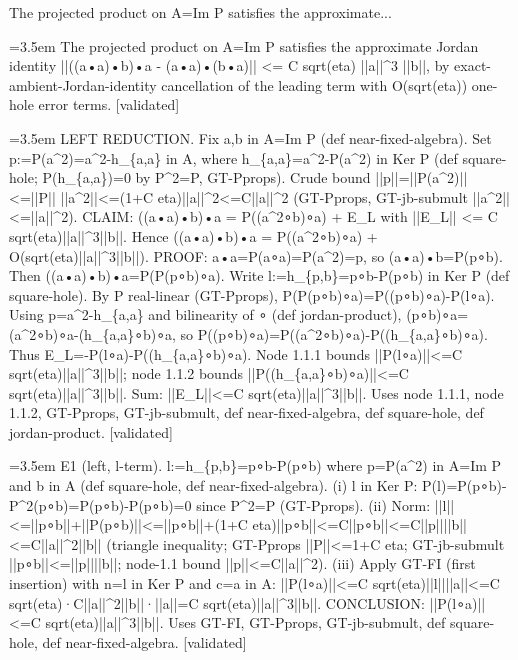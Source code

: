 \documentclass{article}
\newcommand{\step}[1]{\par\noindent\hangindent=3.5em\hangafter=1%
  \makebox[3.5em][l]{\textbf{#1.}}}
\newcommand{\steptag}[1]{\hfill{\small\textsf{[#1]}}}
\begin{document}
\begin{proofbox}{The projected product on A=Im P satisfies the approximate...}
\step{1} The projected product on A=Im P satisfies the approximate Jordan identity ||((a•a)•b)•a - (a•a)•(b•a)|| <= C sqrt(eta) ||a||\textasciicircum{}3 ||b||, by exact-ambient-Jordan-identity cancellation of the leading term with O(sqrt(eta)) one-hole error terms. \steptag{validated} \\[6pt]
\step{1.1} LEFT REDUCTION. Fix a,b in A=Im P (def near-fixed-algebra). Set p:=P(a\textasciicircum{}2)=a\textasciicircum{}2-h\_\{a,a\} in A, where h\_\{a,a\}=a\textasciicircum{}2-P(a\textasciicircum{}2) in Ker P (def square-hole; P(h\_\{a,a\})=0 by P\textasciicircum{}2=P, GT-Pprops). Crude bound ||p||=||P(a\textasciicircum{}2)||<=||P|| ||a\textasciicircum{}2||<=(1+C eta)||a||\textasciicircum{}2<=C||a||\textasciicircum{}2 (GT-Pprops, GT-jb-submult ||a\textasciicircum{}2||<=||a||\textasciicircum{}2). CLAIM: ((a•a)•b)•a = P((a\textasciicircum{}2∘b)∘a) + E\_L with ||E\_L|| <= C sqrt(eta)||a||\textasciicircum{}3||b||. Hence ((a•a)•b)•a = P((a\textasciicircum{}2∘b)∘a) + O(sqrt(eta)||a||\textasciicircum{}3||b||). PROOF: a•a=P(a∘a)=P(a\textasciicircum{}2)=p, so (a•a)•b=P(p∘b). Then ((a•a)•b)•a=P(P(p∘b)∘a). Write l:=h\_\{p,b\}=p∘b-P(p∘b) in Ker P (def square-hole). By P real-linear (GT-Pprops), P(P(p∘b)∘a)=P((p∘b)∘a)-P(l∘a). Using p=a\textasciicircum{}2-h\_\{a,a\} and bilinearity of ∘ (def jordan-product), (p∘b)∘a=(a\textasciicircum{}2∘b)∘a-(h\_\{a,a\}∘b)∘a, so P((p∘b)∘a)=P((a\textasciicircum{}2∘b)∘a)-P((h\_\{a,a\}∘b)∘a). Thus E\_L=-P(l∘a)-P((h\_\{a,a\}∘b)∘a). Node 1.1.1 bounds ||P(l∘a)||<=C sqrt(eta)||a||\textasciicircum{}3||b||; node 1.1.2 bounds ||P((h\_\{a,a\}∘b)∘a)||<=C sqrt(eta)||a||\textasciicircum{}3||b||. Sum: ||E\_L||<=C sqrt(eta)||a||\textasciicircum{}3||b||. Uses node 1.1.1, node 1.1.2, GT-Pprops, GT-jb-submult, def near-fixed-algebra, def square-hole, def jordan-product. \steptag{validated} \\[6pt]
\step{1.1.1} E1 (left, l-term). l:=h\_\{p,b\}=p∘b-P(p∘b) where p=P(a\textasciicircum{}2) in A=Im P and b in A (def square-hole, def near-fixed-algebra). (i) l in Ker P: P(l)=P(p∘b)-P\textasciicircum{}2(p∘b)=P(p∘b)-P(p∘b)=0 since P\textasciicircum{}2=P (GT-Pprops). (ii) Norm: ||l||<=||p∘b||+||P(p∘b)||<=||p∘b||+(1+C eta)||p∘b||<=C||p∘b||<=C||p||||b||<=C||a||\textasciicircum{}2||b|| (triangle inequality; GT-Pprops ||P||<=1+C eta; GT-jb-submult ||p∘b||<=||p||||b||; node-1.1 bound ||p||<=C||a||\textasciicircum{}2). (iii) Apply GT-FI (first insertion) with n=l in Ker P and c=a in A: ||P(l∘a)||<=C sqrt(eta)||l||||a||<=C sqrt(eta)·C||a||\textasciicircum{}2||b||·||a||=C sqrt(eta)||a||\textasciicircum{}3||b||. CONCLUSION: ||P(l∘a)||<=C sqrt(eta)||a||\textasciicircum{}3||b||. Uses GT-FI, GT-Pprops, GT-jb-submult, def square-hole, def near-fixed-algebra. \steptag{validated} \\[4pt]

\end{proofbox}
\end{document}
